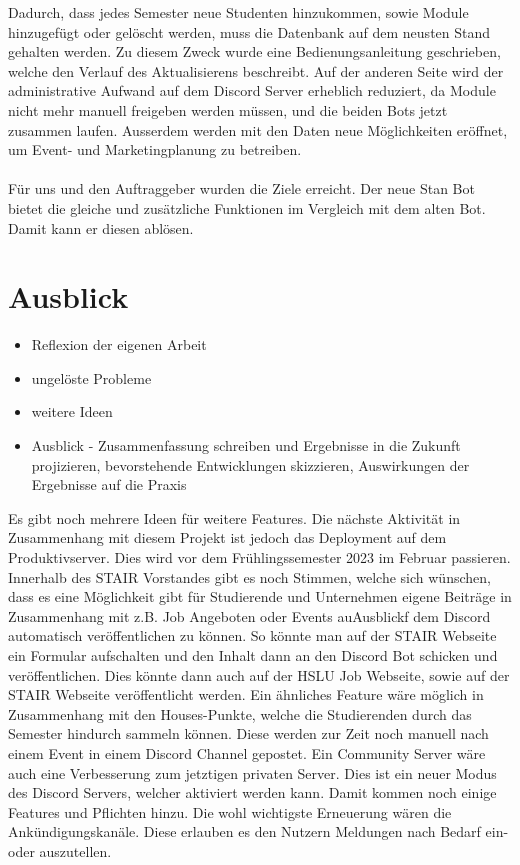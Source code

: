 \documentclass[a4paper, table]{article}
\begin{document}
Dadurch, dass jedes Semester neue Studenten hinzukommen, sowie Module hinzugefügt oder gelöscht werden, muss die Datenbank auf dem neusten Stand gehalten werden.
Zu diesem Zweck wurde eine Bedienungsanleitung geschrieben, welche den Verlauf des Aktualisierens beschreibt.
Auf der anderen Seite wird der administrative Aufwand auf dem Discord Server erheblich reduziert, da Module nicht mehr manuell freigeben werden müssen, und die beiden Bots jetzt zusammen laufen.
Ausserdem werden mit den Daten neue Möglichkeiten eröffnet, um Event- und Marketingplanung zu betreiben.\\\\
Für uns und den Auftraggeber wurden die Ziele erreicht.
Der neue Stan Bot bietet die gleiche und zusätzliche Funktionen im Vergleich mit dem alten Bot.
Damit kann er diesen ablösen.


\newpage
\section{Ausblick}

\begin{itemize}
    \item Reflexion der eigenen Arbeit
    \item ungelöste Probleme
    \item weitere Ideen
    \item Ausblick - Zusammenfassung schreiben und Ergebnisse in die Zukunft projizieren, bevorstehende Entwicklungen skizzieren, Auswirkungen der Ergebnisse auf die Praxis
\end{itemize}

Es gibt noch mehrere Ideen für weitere Features.
Die nächste Aktivität in Zusammenhang mit diesem Projekt ist jedoch das Deployment auf dem Produktivserver.
Dies wird vor dem Frühlingssemester 2023 im Februar passieren.
\newline
Innerhalb des STAIR Vorstandes gibt es noch Stimmen, welche sich wünschen, dass es eine Möglichkeit gibt für Studierende und Unternehmen eigene Beiträge in Zusammenhang mit \gls{z.B.} Job Angeboten oder Events auAusblickf dem Discord automatisch veröffentlichen zu können.
So könnte man auf der STAIR Webseite ein Formular aufschalten und den Inhalt dann an den Discord Bot schicken und veröffentlichen.
Dies könnte dann auch auf der HSLU Job Webseite, sowie auf der STAIR Webseite veröffentlicht werden.
\newline
Ein ähnliches Feature wäre möglich in Zusammenhang mit den Houses-Punkte, welche die Studierenden durch das Semester hindurch sammeln können.
Diese werden zur Zeit noch manuell nach einem Event in einem Discord Channel gepostet.
\newline
Ein Community Server wäre auch eine Verbesserung zum jetztigen privaten Server.
Dies ist ein neuer Modus des Discord Servers, welcher aktiviert werden kann.
Damit kommen noch einige Features und Pflichten hinzu.
Die wohl wichtigste Erneuerung wären die Ankündigungskanäle.
Diese erlauben es den Nutzern Meldungen nach Bedarf ein- oder auszutellen.\autocite{noauthor_richte_nodate}
\end{document}
